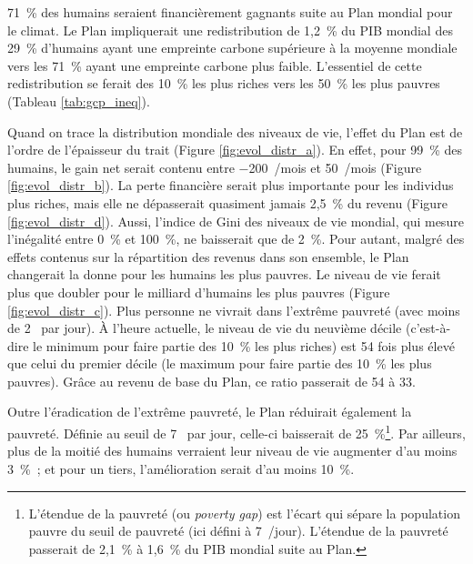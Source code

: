 \documentclass[a5paper,french,openany]{memoir}
\begin{document}
71~\% des humains seraient financièrement gagnants suite au Plan mondial pour le climat. Le Plan impliquerait une redistribution de 1,2~\% du PIB mondial des 29~\% d'humains ayant une empreinte carbone supérieure à la moyenne mondiale vers les 71~\% ayant une empreinte carbone plus faible. L'essentiel %
de cette redistribution se ferait des 10~\% les plus riches vers les 50~\% les plus pauvres (Tableau \ref{tab:gcp_ineq}). 



Quand on trace la distribution mondiale des niveaux de vie, l'effet du Plan est de l'ordre de l'épaisseur du trait (Figure \ref{fig:evol_distr_a}). En effet, pour 99~\% des humains, le gain net serait contenu entre $-$200~\textit{\texteuro{}}/mois et 50~\textit{\texteuro{}}/mois (Figure \ref{fig:evol_distr_b}). La perte financière serait plus importante pour les individus plus riches, mais elle ne dépasserait quasiment jamais 2,5~\% du revenu (Figure \ref{fig:evol_distr_d}). Aussi, l'indice de Gini des niveaux de vie mondial, qui mesure l'inégalité entre 0~\% et 100~\%, ne baisserait que de 2~\%. 
Pour autant, malgré des effets contenus sur la répartition des revenus dans son ensemble, le Plan changerait la donne pour les humains les plus pauvres. Le niveau de vie ferait plus que doubler pour le milliard d'humains les plus pauvres (Figure \ref{fig:evol_distr_c}). Plus personne ne vivrait dans l'extrême pauvreté (avec moins de 2~\textit{\texteuro{}} par jour). 
À l'heure actuelle, le niveau de vie du %
neuvième décile (c'est-à-dire le minimum pour faire partie des 10~\% les plus riches) est 54 fois plus élevé que celui du premier %
décile (le maximum pour faire partie des 10~\% les plus pauvres). Grâce au revenu de base du Plan, ce ratio passerait de 54 à 33. 

Outre l'éradication de l'extrême pauvreté, le Plan réduirait également la pauvreté. Définie au seuil de 7~\textit{\texteuro{}} par jour, %
celle-ci baisserait de 25~\%\footnote{L'étendue de la pauvreté (ou \textit{poverty gap}) est l'écart qui sépare la population pauvre du seuil de pauvreté (ici défini à 7~\textit{\texteuro{}}/jour). L'étendue de la pauvreté passerait de 2,1~\% à 1,6~\% du PIB mondial suite au Plan.}. 
Par ailleurs, plus de la moitié des humains verraient leur niveau de vie augmenter d'au moins 3~\%~; et pour un tiers, l'amélioration serait d'au moins 10~\%. 
\end{document}
